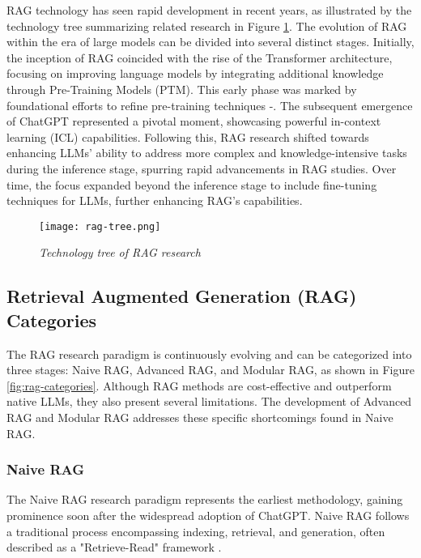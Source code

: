 RAG technology has seen rapid development in recent years, as illustrated by the technology tree summarizing related research in Figure \ref{fig:rag-tree}. The evolution of RAG within the era of large models can be divided into several distinct stages. Initially, the inception of RAG coincided with the rise of the Transformer architecture, focusing on improving language models by integrating additional knowledge through Pre-Training Models (PTM). This early phase was marked by foundational efforts to refine pre-training techniques \cite{arora2023garmeetsrag}-\cite{borgeaud2022improving}. The subsequent emergence of ChatGPT \cite{ouyang2022training} represented a pivotal moment, showcasing powerful in-context learning (ICL) capabilities. Following this, RAG research shifted towards enhancing LLMs' ability to address more complex and knowledge-intensive tasks during the inference stage, spurring rapid advancements in RAG studies. Over time, the focus expanded beyond the inference stage to include fine-tuning techniques for LLMs, further enhancing RAG's capabilities.

\begin{figure}[H]
    \centering
    \texttt{[image: rag-tree.png]}
    \caption{
        \it{ Technology tree of RAG research \cite{gao2024retrievalaugmented}}
    }
    \label{fig:rag-tree}
\end{figure}

\subsection{Retrieval Augmented Generation (RAG) Categories}

The RAG research paradigm is continuously evolving and can be categorized into three stages: Naive RAG, Advanced RAG, and Modular RAG, as shown in Figure \ref{fig:rag-categories}. Although RAG methods are cost-effective and outperform native LLMs, they also present several limitations. The development of Advanced RAG and Modular RAG addresses these specific shortcomings found in Naive RAG.

\subsubsection*{Naive RAG}

The Naive RAG research paradigm represents the earliest methodology, gaining prominence soon after the widespread adoption of ChatGPT. Naive RAG follows a traditional process encompassing indexing, retrieval, and generation, often described as a "Retrieve-Read" framework \cite{ma2023query}.

